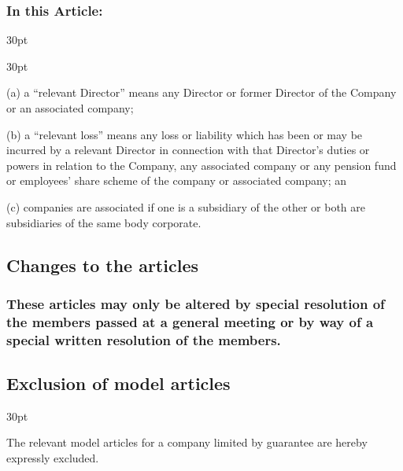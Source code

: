 \documentclass[12pt]{article}
\def\clauseindent{30pt}
\newenvironment{subindentpara}{\begin{adjustwidth}{\clauseindent}{}\begin{hanginglist}}{\end{hanginglist}\end{adjustwidth}}
\newenvironment{subindentlist}{\begin{adjustwidth}{\clauseindent}{}\begin{labeledlist}{\clauseindent}}{\end{labeledlist}\end{adjustwidth}}
\begin{document}
\subsubsection{In this Article:}
\begin{subindentlist}
    \item [(a)] a ``relevant Director'' means any Director or former Director of the Company or an associated company;
    \item [(b)] a ``relevant loss'' means any loss or liability which has been or may be incurred by a relevant Director in connection with that Director's duties or powers in relation to the Company, any associated company or any pension fund or employees' share scheme of the company or associated company; an
    \item [(c)] companies are associated if one is a subsidiary of the other or both are subsidiaries of the same body corporate.
\end{subindentlist}

\subsection{Changes to the articles}
\subsubsection{These articles may only be altered by special resolution of the members passed at a general meeting or by way of a special written resolution of the members.}

\subsection{Exclusion of model articles}
\begin{subindentpara}
    \item The relevant model articles for a company limited by guarantee are hereby expressly excluded.
\end{subindentpara}
\end{document}
